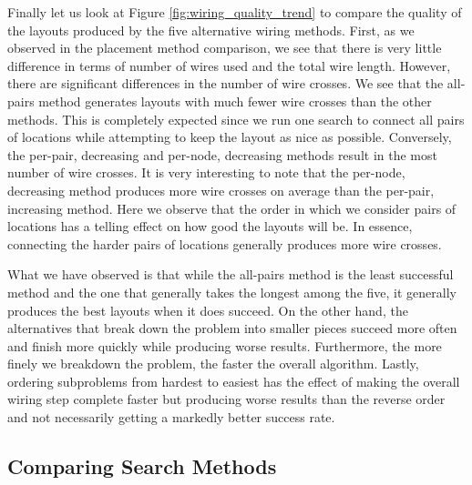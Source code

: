 Finally let us look at Figure \ref{fig:wiring_quality_trend} to compare the
quality of the layouts produced by the five alternative wiring methods. First,
as we observed in the placement method comparison, we see that there is very
little difference in terms of number of wires used and the total wire length.
However, there are significant differences in the number of wire crosses. We see
that the all-pairs method generates layouts with much fewer wire crosses than
the other methods. This is completely expected since we run one search to
connect all pairs of locations while attempting to keep the layout as nice as
possible. Conversely, the per-pair, decreasing and per-node, decreasing methods
result in the most number of wire crosses. It is very interesting to note that
the per-node, decreasing method produces more wire crosses on average than the
per-pair,
increasing method. Here we observe that the order in which we consider pairs of
locations has a telling effect on how good the layouts will be. In essence,
connecting the harder pairs of locations generally produces more wire crosses.

What we have observed is that while the all-pairs method is the least successful
method and the one that generally takes the longest among the five,
it generally produces the best layouts when it does succeed. On the other hand,
the alternatives that break down the problem into smaller pieces succeed more
often and finish more quickly while producing worse results. Furthermore,
the more finely we breakdown the problem, the faster the overall algorithm.
Lastly, ordering subproblems from hardest to easiest has the effect of making the
overall wiring step complete faster but producing worse results than the reverse
order and not necessarily getting a markedly better success rate.

\subsection{Comparing Search Methods}

